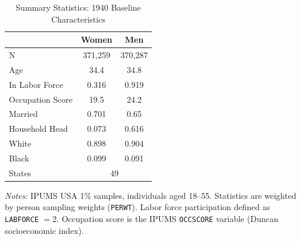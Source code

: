 \begin{table}[htbp]
\centering
\caption{Summary Statistics: 1940 Baseline Characteristics}
\label{tab:summary}
\small
\begin{tabular}{lcc}
\hline\hline
 & Women & Men \\
\hline
N & 371,259 & 370,287 \\[3pt]
Age & 34.4 & 34.8 \\
In Labor Force & 0.316 & 0.919 \\
Occupation Score & 19.5 & 24.2 \\
Married & 0.701 & 0.65 \\
Household Head & 0.073 & 0.616 \\
White & 0.898 & 0.904 \\
Black & 0.099 & 0.091 \\[3pt]
States & \multicolumn{2}{c}{49} \\
\hline\hline
\end{tabular}
\begin{tablenotes}
\small
\item \textit{Notes:} IPUMS USA 1\% samples, individuals aged 18--55. Statistics are weighted by person sampling weights (\texttt{PERWT}). Labor force participation defined as \texttt{LABFORCE} $= 2$. Occupation score is the IPUMS \texttt{OCCSCORE} variable (Duncan socioeconomic index).
\end{tablenotes}
\end{table}
